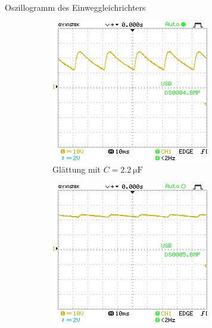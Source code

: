 \documentclass{article}
\theoremstyle{definition}
\begin{document}
\begin{aufgabe}{Oszillogramm des Einweggleichrichters}
\begin{figure}[H]
        \hfill
        \begin{subfigure}[b]{0.49 \textwidth}
            \includegraphics[width=\textwidth]{MesswerteVersuch2/DS0004.png}
            \caption{Glättung mit $C = \SI{2.2}{\micro\farad}$}
            \label{a3_b}
        \end{subfigure}
        \vspace{1em}
        \begin{subfigure}[b]{0.49 \textwidth}
            \includegraphics[width=\textwidth]{MesswerteVersuch2/DS0005.png}

\end{subfigure}
\end{figure}
\end{aufgabe}
\end{document}
